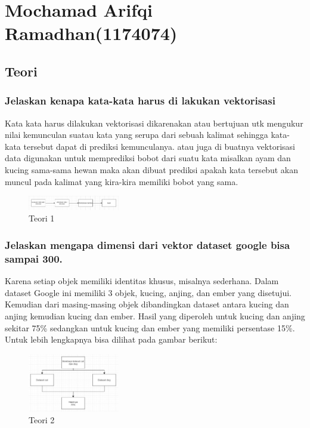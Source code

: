 \section{Mochamad Arifqi Ramadhan(1174074)}
\subsection{Teori}
\subsubsection{Jelaskan kenapa kata-kata harus di lakukan vektorisasi}

\hfill\break
Kata kata harus dilakukan vektorisasi dikarenakan atau bertujuan utk mengukur nilai kemunculan suatau kata yang serupa dari sebuah kalimat sehingga kata-kata tersebut dapat di prediksi kemunculanya. atau juga di buatnya vektorisasi data digunakan untuk memprediksi bobot dari suatu kata misalkan ayam dan kucing sama-sama hewan maka akan dibuat prediksi apakah kata tersebut akan muncul pada kalimat yang kira-kira memiliki bobot yang sama.
\begin{figure}[H]
\includegraphics[width=4cm]{figures/1174074/5/1.jpg}
\centering
\caption{Teori 1}
\end{figure}

\subsubsection{Jelaskan mengapa dimensi dari vektor dataset google bisa sampai 300.}

\hfill\break
Karena setiap objek memiliki identitas khusus, misalnya sederhana. Dalam dataset Google ini memiliki 3 objek, kucing, anjing, dan ember yang disetujui. Kemudian dari masing-masing objek dibandingkan dataset antara kucing dan anjing kemudian kucing dan ember. Hasil yang diperoleh untuk kucing dan anjing sekitar 75\% sedangkan untuk kucing dan ember yang memiliki persentase 15\%. Untuk lebih lengkapnya bisa dilihat pada gambar berikut: 
\begin{figure}[H]
\includegraphics[width=4cm]{figures/1174074/5/2.jpg}
\centering
\caption{Teori 2}
\end{figure}

